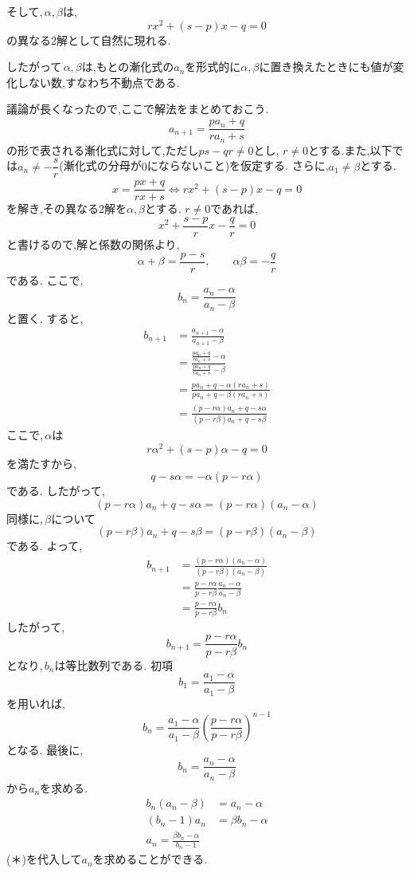     そして,\,$\alpha,\beta$は,
    \[
      rx^2+(s-p)x-q=0
    \]
    の異なる2解として自然に現れる.
    
    したがって\,$\alpha,\beta$は,もとの漸化式の$a_n$を形式的に$\alpha,\beta$に置き換えたときにも値が変化しない数,すなわち不動点である.
    
    議論が長くなったので,ここで解法をまとめておこう.
    \[
      a_{n+1}=\frac{pa_n+q}{ra_n+s} 
    \]
    の形で表される漸化式に対して,ただし$ps-qr\ne0$とし,
    $r\ne0$とする.また,以下では$a_n\ne-\dfrac sr$(漸化式の分母が$0$にならないこと)を仮定する.
    さらに,$a_1\ne\beta$とする.
    \[
      x= \frac{px+q}{rx+s} \Leftrightarrow rx^2+(s-p)x-q=0
    \]
    を解き,その異なる2解を$\alpha,\beta$とする.
    $r\neq0$であれば,
    \[
      x^2+\frac{s-p}{r}x-\frac qr=0
    \]
    と書けるので,解と係数の関係より,
    \[
      \alpha+\beta=\frac{p-s}{r},
      \qquad
      \alpha\beta=-\frac qr
    \]
    である.
    ここで,
    \[
      b_n=\frac{a_n-\alpha}{a_n-\beta}
    \]
    と置く.
    すると,
    \begin{align*}
      b_{n+1}&=\frac{a_{n+1}-\alpha}{a_{n+1}-\beta}\\
      &=\frac{\displaystyle\frac{pa_n+q}{ra_n+s}-\alpha}{\displaystyle\frac{pa_n+q}{ra_n+s}-\beta}\\
      &=\frac{pa_n+q-\alpha(ra_n+s)}{pa_n+q-\beta(ra_n+s)}\\
      &=\frac{(p-r\alpha)a_n+q-s\alpha}{(p-r\beta)a_n+q-s\beta}
    \end{align*}
    ここで,\,$\alpha$は
    \[
      r\alpha^2+(s-p)\alpha-q=0
    \]
    を満たすから,
    \[
      q-s\alpha=-\alpha(p-r\alpha)
    \]
    である.
    したがって,
    \[
      (p-r\alpha)a_n+q-s\alpha
      =(p-r\alpha)(a_n-\alpha)
    \]
    同様に,\,$\beta$について
    \[
      (p-r\beta)a_n+q-s\beta
      =(p-r\beta)(a_n-\beta)
    \]
    である.
    よって,
    \begin{align*}
      b_{n+1}&=\frac{(p-r\alpha)(a_n-\alpha)}{(p-r\beta)(a_n-\beta)}\\
      &=\frac{p-r\alpha}{p-r\beta}\frac{a_n-\alpha}{a_n-\beta}\\
      &=\frac{p-r\alpha}{p-r\beta}b_n
    \end{align*}
    したがって,
    \[
      b_{n+1}=\frac{p-r\alpha}{p-r\beta}b_n
    \]
    となり,\,$b_n$は等比数列である.
    初項
    \[
      b_1=\frac{a_1-\alpha}{a_1-\beta}
    \]
    を用いれば,
    \[
      b_n=\frac{a_1-\alpha}{a_1-\beta}\left(\frac{p-r\alpha}{p-r\beta}\right)^{n-1} \tag*{\(\cdots\) (＊)}
    \]
    となる.
    最後に,
    \[
      b_n=\frac{a_n-\alpha}{a_n-\beta}
    \]
    から$a_n$を求める.
    \begin{align*}
      b_n(a_n-\beta)&=a_n-\alpha\\
      (b_n-1)a_n&=\beta b_n-\alpha\\
      a_n=\frac{\beta b_n-\alpha}{b_n-1}
    \end{align*}
    (＊)を代入して$a_n$を求めることができる.

